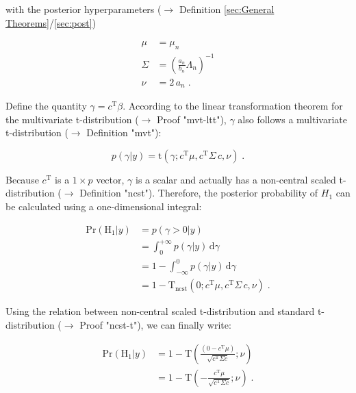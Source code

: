 \documentclass[a4paper,12pt,twoside]{book}
\begin{document}
with the posterior hyperparameters ($\rightarrow$ Definition \ref{sec:General Theorems}/\ref{sec:post})

\begin{equation} \label{eq:blr-pp-GLM-NG-post-par-beta}
\begin{split}
\mu &= \mu_n \\
\Sigma &= \left( \frac{a_n}{b_n} \Lambda_n \right)^{-1} \\
\nu &= 2 \, a_n \; .
\end{split}
\end{equation}

Define the quantity $\gamma = c^\mathrm{T} \beta$. According to the linear transformation theorem for the multivariate t-distribution ($\rightarrow$ Proof "mvt-ltt"), $\gamma$ also follows a multivariate t-distribution ($\rightarrow$ Definition "mvt"):

\begin{equation} \label{eq:blr-pp-GLM-NG-post-gamma}
p(\gamma|y) = \mathrm{t}(\gamma; c^\mathrm{T} \mu, c^\mathrm{T} \Sigma \, c, \nu) \; .
\end{equation}

Because $c^\mathrm{T}$ is a $1 \times p$ vector, $\gamma$ is a scalar and actually has a non-central scaled t-distribution ($\rightarrow$ Definition "ncst"). Therefore, the posterior probability of $H_1$ can be calculated using a one-dimensional integral:

\begin{equation} \label{eq:blr-pp-GLM-NG-post-prob-H0-s1}
\begin{split}
\mathrm{Pr}\left( \mathrm{H}_1 | y \right) &= p(\gamma > 0|y) \\
&= \int_{0}^{+\infty} p(\gamma|y) \, \mathrm{d}\gamma \\
&= 1 - \int_{-\infty}^{0} p(\gamma|y) \, \mathrm{d}\gamma \\
&= 1 - \mathrm{T}_\mathrm{ncst}(0; c^\mathrm{T} \mu, c^\mathrm{T} \Sigma \, c, \nu) \; .
\end{split}
\end{equation}

Using the relation between non-central scaled t-distribution and standard t-distribution ($\rightarrow$ Proof "ncst-t"), we can finally write:

\begin{equation} \label{eq:blr-pp-GLM-NG-post-prob-H0-s2}
\begin{split}
\mathrm{Pr}\left( \mathrm{H}_1 | y \right) &= 1 - \mathrm{T}\left( \frac{(0 - c^\mathrm{T} \mu)}{\sqrt{c^\mathrm{T} \Sigma c}}; \nu \right) \\
&= 1 - \mathrm{T}\left( -\frac{c^\mathrm{T} \mu}{\sqrt{c^\mathrm{T} \Sigma c}}; \nu \right) \; .
\end{split}
\end{equation}
\end{document}
